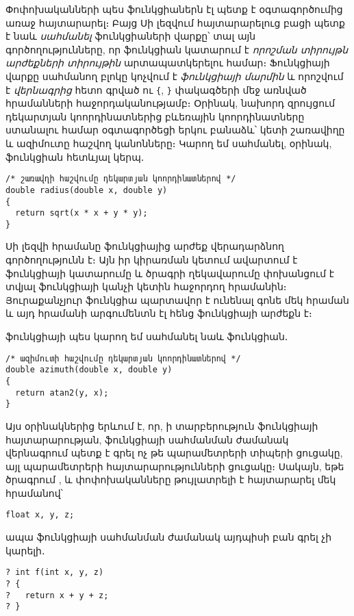 Փոփոխականների պես ֆունկցիաներն էլ պետք է օգտագործումից առաջ հայտարարել։
Բայց Սի լեզվում հայտարարելուց բացի պետք է նաև \emph{սահմանել}
 ֆունկցիաների վարքը՝ տալ այն գործողությունները,
որ ֆունկցիան կատարում է \emph{որոշման տիրույթն} \emph{արժեքների տիրույթին}
արտապատկերելու համար։ Ֆունկցիայի վարքը սահմանող բլոկը կոչվում է
\emph{ֆունկցիայի մարմին} և որոշվում է
\emph{վերնագրից} հետո գրված ու \verb|{|, \verb|}| փակագծերի մեջ առնված
հրամանների հաջորդականությամբ։ Օրինակ, նախորդ զրույցում դեկարտյան
կոորդինատներից բևեռային կոորդինատները ստանալու համար օգտագործեցի երկու
բանաձև՝ կետի շառավիղը և ազիմուտը հաշվող կանոնները։ Կարող եմ սահմանել,
օրինակ,  ֆունկցիան հետևյալ կերպ․

\begin{Verbatim}
/* շառավղի հաշվումը դեկարտյան կոորդինատներով */
double radius(double x, double y)
{
  return sqrt(x * x + y * y);
}
\end{Verbatim}

Սի լեզվի  հրամանը ֆունկցիայից արժեք
վերադարձնող գործողությունն է։ Այն իր կիրառման կետում ավարտում է
ֆունկցիայի կատարումը և ծրագրի ղեկավարումը փոխանցում է տվյալ ֆունկցիայի
կանչի կետին հաջորդող հրամանին։ Յուրաքանչյուր ֆունկցիա պարտավոր է ունենալ
գոնե մեկ  հրաման և այդ հրամանի արգումենտն էլ հենց
ֆունկցիայի արժեքն է։

 ֆունկցիայի պես կարող եմ սահմանել նաև 
ֆունկցիան․

\begin{Verbatim}
/* ազիմուտի հաշվումը դեկարտյան կոորդինատներով */
double azimuth(double x, double y)
{
  return atan2(y, x);
}
\end{Verbatim}

Այս օրինակներից երևում է, որ, ի տարբերություն ֆունկցիայի հայտարարության,
ֆունկցիայի սահմանման ժամանակ վերնագրում պետք է գրել ոչ թե պարամետրերի տիպերի
ցուցակը, այլ պարամետրերի հայտարարությունների ցուցակը։ Սակայն, եթե ծրագրում
,  և  փոփոխականները թույլատրելի է հայտարարել
մեկ հրամանով՝

\begin{Verbatim}
float x, y, z;
\end{Verbatim}

ապա ֆունկցիայի սահմանման ժամանակ այդպիսի բան գրել չի կարելի․

\begin{Verbatim}
? int f(int x, y, z)
? {
?   return x + y + z;
? }
\end{Verbatim}

